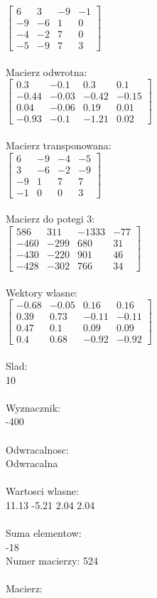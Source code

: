 \documentclass[a4paper,12pt]{article}
\begin{document}
$\begin{bmatrix} 6&3&-9&-1\\-9&-6&1&0\\-4&-2&7&0\\-5&-9&7&3 \end{bmatrix}$
\\
\\
Macierz odwrotna:\\

$\begin{bmatrix} 0.3&-0.1&0.3&0.1\\-0.44&-0.03&-0.42&-0.15\\0.04&-0.06&0.19&0.01\\-0.93&-0.1&-1.21&0.02 \end{bmatrix}$
\\
\\
Macierz transponowana:\\

$\begin{bmatrix} 6&-9&-4&-5\\3&-6&-2&-9\\-9&1&7&7\\-1&0&0&3 \end{bmatrix}$
\\
\\
Macierz do potegi 3:\\

$\begin{bmatrix} 586&311&-1333&-77\\-460&-299&680&31\\-430&-220&901&46\\-428&-302&766&34 \end{bmatrix}$
\\
\\
Wektory wlasne:\\

$\begin{bmatrix} -0.68&-0.05&0.16&0.16\\0.39&0.73&-0.11&-0.11\\0.47&0.1&0.09&0.09\\0.4&0.68&-0.92&-0.92 \end{bmatrix}$
\\
\\
Slad:\\
10
\\
\\
Wyznacznik:\\
-400
\\
\\
Odwracalnosc:\\
Odwracalna
\\
\\
Wartosci wlasne:\\
11.13 -5.21 2.04 2.04
\\
\\
Suma elementow:\\
-18
\\
\newpage
Numer macierzy:
524
\\
\\
Macierz:\\
\end{document}
